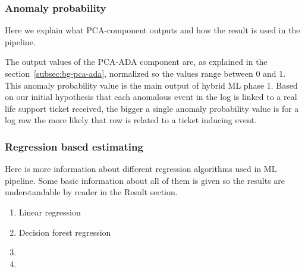 
\subsubsection*{Anomaly probability}
\begin{itcomment}
    Here we explain what PCA-component outputs and how the result is used in the pipeline.
\end{itcomment}

The output values of the PCA-ADA component are,
as explained in the section~\ref{subsec:bg-pca-ada},
normalized so the values range between 0 and 1.
This anomaly probability value
is the main output of hybrid ML phase 1.
Based on our initial hypothesis
that each anomalous event in the log
is linked to a real life support ticket received,
the bigger a single anomaly probability value is for a log row
the more likely that row is related to a ticket inducing event.



\subsubsection*{Regression based estimating}
\begin{itcomment}
    Here is more information about different regression algorithms
    used in ML pipeline.
    Some basic information about all of them is given so the results are understandable
    by reader in the Result section.
\end{itcomment}

\begin{enumerate}
    \item Linear regression
    \item Decision forest regression
    \item \etc
    \item \etc
\end{enumerate}


\clearpage